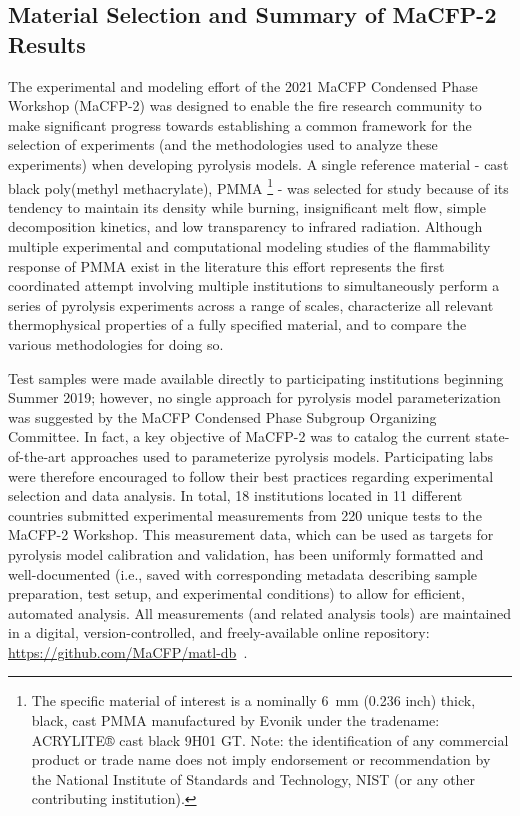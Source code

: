 \documentclass[12pt]{article}
\begin{document}
\subsection{Material Selection and Summary of MaCFP-2 Results}
The experimental and modeling effort of the 2021 MaCFP Condensed Phase Workshop (MaCFP-2) was designed to enable the fire research community to make significant progress towards establishing a common framework for the selection of experiments (and the methodologies used to analyze these experiments) when developing pyrolysis models. A single reference material - cast black poly(methyl methacrylate), PMMA \footnote{The specific material of interest is a nominally 6~mm (0.236 inch) thick, black, cast PMMA manufactured by Evonik under the tradename: ACRYLITE® cast black 9H01 GT. Note: the identification of any commercial product or trade name does not imply endorsement or recommendation by the National Institute of Standards and Technology, NIST (or any other contributing institution).} - was selected for study because of its tendency to maintain its density while burning, insignificant melt flow, simple decomposition kinetics, and low transparency to infrared radiation. Although multiple experimental \cite{fiola2020comparison, kashiwagi1982study, hirata1985thermal, tewarson1992fire, rhodes1996burning} and computational modeling studies of the flammability response of PMMA exist in the literature \cite{fiola2020comparison, consalvi2008numerical, leventon2015flame, fukumoto2018large} this effort represents the first coordinated attempt involving multiple institutions to simultaneously perform a series of pyrolysis experiments across a range of scales, characterize all relevant thermophysical properties of a fully specified material, and to compare the various methodologies for doing so.

Test samples were made available directly to participating institutions beginning Summer 2019; however, no single approach for pyrolysis model parameterization was suggested by the MaCFP Condensed Phase Subgroup Organizing Committee. In fact, a key objective of MaCFP-2 was to catalog the current state-of-the-art approaches used to parameterize pyrolysis models. Participating labs were therefore encouraged to follow their best practices regarding experimental selection and data analysis. In total, 18 institutions located in 11 different countries submitted experimental measurements from 220 unique tests to the MaCFP-2 Workshop. This measurement data, which can be used as targets for pyrolysis model calibration and validation, has been uniformly formatted and well-documented (i.e., saved with corresponding metadata describing sample preparation, test setup, and experimental conditions) to allow for efficient, automated analysis. All measurements (and related analysis tools) are maintained in a digital, version-controlled, and freely-available online repository: \url{https://github.com/MaCFP/matl-db}~\cite{MaCFP-cond-db}. 
\end{document}
